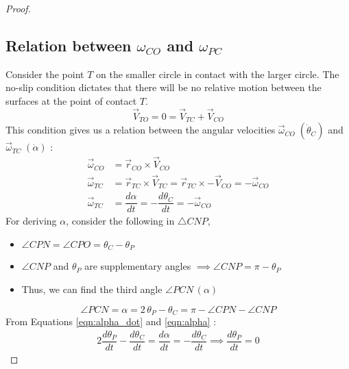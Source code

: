\documentclass[12pt]{article}
\begin{document}
\begin{proof}
    \subsection{Relation between $\omega_{CO}$ and $\omega_{PC}$}
    Consider the point $T$ on the smaller circle in contact with the larger circle. The no-slip condition dictates that there will be no relative motion between the surfaces at the point of contact $T$.
    \begin{equation}
        \vec{V}_{TO} = 0 = \vec{V}_{TC} + \vec{V}_{CO} \tag{No-Slip Condition} \label{eqn:no-slip}
    \end{equation}
    This condition gives us a relation between the angular velocities $\vec{\omega}_{CO} \; (\dot{\theta}_C)$ and $\vec{\omega}_{TC} \; (\dot{\alpha})$ :
    \begin{align}
        \vec{\omega}_{CO} &= \vec{r}_{CO} \times  \vec{V}_{CO} \nonumber \\
        \vec{\omega}_{TC} &= \vec{r}_{TC} \times  \vec{V}_{TC} = \vec{r}_{TC} \times -\vec{V}_{CO} = -\vec{\omega}_{CO} \nonumber \\
        \vec{\omega}_{TC} &= \boxed{\dfrac{d \alpha}{d t} = -\dfrac{d \theta_C}{d t}} = -\vec{\omega}_{CO} \label{eqn:alpha_dot}
    \end{align}
    For deriving $\alpha$, consider the following in $\triangle CNP$,
    \begin{itemize}
        \item $\angle CPN = \angle CPO = \theta_C - \theta_P$
        \item $\angle CNP$ and $\theta_P$ are supplementary angles $\implies \angle CNP = \pi - \theta_P$
        \item Thus, we can find the third angle $\angle PCN \, (\alpha)$
    \end{itemize}
    \begin{equation}
        \angle PCN = \boxed{\alpha = 2 \, \theta_P - \theta_C} = \pi - \angle CPN - \angle CNP \label{eqn:alpha}
    \end{equation}
    From Equations \ref{eqn:alpha_dot} and \ref{eqn:alpha} :
    \begin{gather}
        2\dfrac{d \theta_P}{d t} - \dfrac{d \theta_C}{d t} = \dfrac{d \alpha}{d t} = -\dfrac{d \theta_C}{d t} \implies \boxed{\dfrac{d \theta_P}{d t} = 0} \label{eqn:locus_theta}
    \end{gather}

\end{proof}
\end{document}
